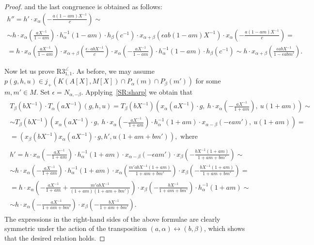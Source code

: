 \documentclass[oneside, 8pt]{amsart}
\theoremstyle{remark}
\theoremstyle{definition}
\numberwithin{equation}{section}
\begin{document}
\begin{proof}
  and the last congruence is obtained as follows:
 \begin{multline} \nonumber
 h'' = h' \cdot x_\alpha\left(-\tfrac{a(1 - am)X^{-1}}{c}\right) \sim \\ \sim  h\cdot x_\alpha\left(\tfrac{a X^{-1}}{1-am}\right) \cdot h_{\alpha}^{-1}(1-am)\cdot h_{\beta}(c^{-1})\cdot x_{\alpha + \beta}\left(\epsilon ab(1-am)X^{-1}\right)\cdot x_\alpha\left(-\tfrac{a(1 - am)X^{-1}}{c}\right) = \\
 = h\cdot x_\alpha\left(\tfrac{a X^{-1}}{1-am}\right) \cdot x_{\alpha + \beta}\left(\tfrac{\epsilon \cdot abX^{-1}}{c}\right)\cdot x_\alpha\left(-\tfrac{aX^{-1}}{1 - am}\right) \cdot h_{\alpha}^{-1}(1-am)\cdot h_{\beta}(c^{-1}) \sim
 h\cdot x_{\alpha + \beta}\left(\tfrac{\epsilon   abX^{-1}}{1 - \epsilon a b m'}\right).
\end{multline}

Now let us prove $\text{R3}_{1,1}^\angle$. As before, we may assume $p(g, h, u) \in j_+(K(A[X], M[X]) \cap P_\alpha(m) \cap P_{\beta}(m'))$ for some $m, m' \in M$.
Set $\epsilon = N_{\alpha,-\beta}$. Applying~\cref{SR:sharp} we obtain that
\begin{gather*} \begin{multlined} \nonumber
 T_\beta(bX^{-1}) \cdot T_\alpha(aX^{-1}) \left(g, h, u\right) = 
 T_\beta(bX^{-1}) \left(x_\alpha(aX^{-1})\cdot g,\ h \cdot x_\alpha\left(-\tfrac{aX^{-1}}{1 + am}\right) ,\ u(1 + am)\right) \sim \\ 
 \sim T_\beta(bX^{-1}) \left(x_\alpha(aX^{-1})\cdot g,\ h \cdot x_\alpha\left(-\tfrac{aX^{-1}}{1 + am}\right) \cdot h^{-1}_\alpha(1 + am) \cdot x_{\alpha-\beta}(-\epsilon am'),\ u(1 + am)\right) = \\
 = (x_\beta(bX^{-1}) x_\alpha(aX^{-1}) \cdot g, h', u(1 + am + bm')), \text{ where} \end{multlined} \\
\begin{multlined} \nonumber
 h' = h \cdot x_\alpha\left(-\tfrac{aX^{-1}}{1 + am}\right) \cdot h^{-1}_\alpha(1 + am) \cdot x_{\alpha-\beta}(-\epsilon am') \cdot x_\beta\left(-\tfrac{bX^{-1}(1+am)}{1 + am + bm'}\right) \sim \\
    \sim h \cdot x_\alpha\left(-\tfrac{aX^{-1}}{1 + am}\right) \cdot h^{-1}_\alpha(1 + am) \cdot x_{\alpha}\left(\tfrac{m'abX^{-1}(1+am)}{1 + am + bm'}\right) \cdot x_\beta\left(-\tfrac{bX^{-1}(1+am)}{1 + am + bm'}\right) = \\
 = h \cdot x_\alpha\left(-\tfrac{aX^{-1}}{1 + am} + \tfrac{m'abX^{-1}}{(1+am)(1 + am + bm')}\right) \cdot x_\beta\left(-\tfrac{bX^{-1}}{1 + am + bm'}\right) \cdot h^{-1}_\alpha(1 + am) \sim \\
 \sim h \cdot x_\alpha\left(-\tfrac{aX^{-1}}{1 + am + bm'}\right) \cdot x_\beta\left(-\tfrac{bX^{-1}}{1 + am + bm'}\right).
\end{multlined}
\end{gather*}
The expressions in the right-hand sides of the above formulae are clearly symmetric under the action of the transposition $(a, \alpha) \leftrightarrow (b, \beta)$, which shows that the desired relation holds.
\end{proof}
\end{document}
